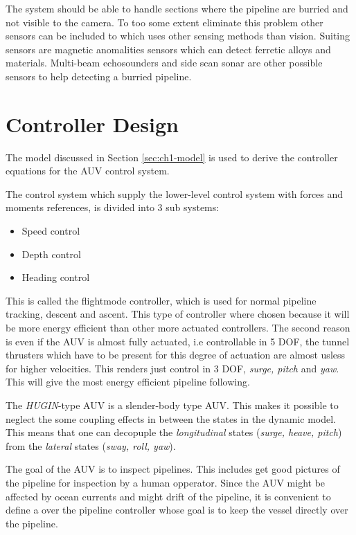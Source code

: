 	The system should be able to handle sections where the pipeline are burried and not visible to the
	camera. To too some extent eliminate this problem other sensors can be included to which uses other
	sensing methods than vision. Suiting sensors are magnetic anomalities sensors which can detect
	ferretic alloys and materials. Multi-beam echosounders and side scan sonar are other possible sensors
	to help detecting a burried pipeline.
	
	
\section{Controller Design}
	The model discussed in Section \ref{sec:ch1-model} is used to derive the controller equations for the
	AUV control system.

	The control system which supply the lower-level control system with forces and moments references, is 
	divided into 3 sub systems:
		\begin{itemize}
			\item Speed control
			\item Depth control
			\item Heading control
		\end{itemize}
	This is called the flightmode controller, which is used for normal pipeline tracking, descent and
	ascent. This type of controller where chosen because it will be more energy efficient than other more
	actuated controllers. The second reason is even if the AUV is almost fully actuated, i.e
	controllable in 5 DOF, the tunnel thrusters which have to be present for this degree of actuation are almost
	usless for higher velocities. This renders just control in 3 DOF, \textit{surge, pitch} and
	\textit{yaw}. This will give the most energy efficient pipeline following. 
	
	The \textit{HUGIN}-type AUV is a slender-body type AUV. This makes it possible to neglect the some
	coupling effects in between the states in the dynamic model. This means that one can decopuple the
	\textit{longitudinal} states (\textit{surge, heave, pitch}) from the \textit{lateral} states 
	(\textit{sway, roll, yaw}).

	The goal of the AUV is to inspect pipelines. This includes get good pictures of the pipeline for
	inspection by a human opperator. Since the AUV might be affected by ocean currents and might drift of
	the pipeline, it is convenient to define a over the pipeline controller whose goal is to keep the
	vessel directly over the pipeline. 


